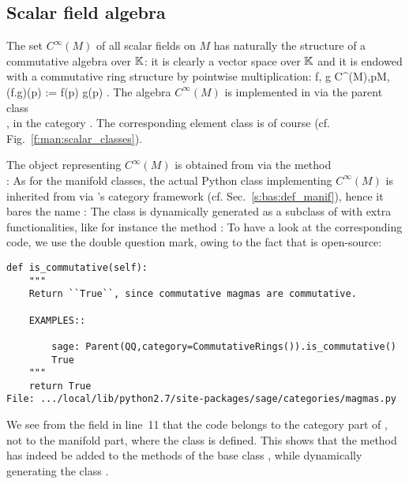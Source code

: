 \subsection{Scalar field algebra} \label{s:man:scal_algebra}

The set $C^\infty(M)$
of all scalar fields on $M$ has naturally the structure of a
commutative algebra over $\mathbb{K}$: it is clearly a vector
space over $\mathbb{K}$ and it is endowed with a commutative ring structure
by pointwise multiplication:
\be
\forall f, g \in C^\infty(M),\quad \forall p\in M,\quad
(f.g)(p) := f(p) g(p) .
\ee
The algebra $C^\infty(M)$ is implemented in \Sage{} via the parent
class\\ , in the category
. The corresponding element class
is of course  (cf. Fig.~\ref{f:man:scalar_classes}).

The \Sage{} object representing $C^\infty(M)$ is obtained from  via the
method\\ :
As for the manifold classes, the actual Python class implementing
$C^\infty(M)$ is inherited from  via \Sage{}'s
category framework (cf. Sec.~\ref{s:bas:def_manif}), hence it bares the name :
The class  is dynamically generated
as a subclass of  with extra functionalities, like
for instance the method :
To have a look at the corresponding code,
we use the double question mark, owing to the fact that \Sage{} is open-source:
\begin{lstlisting}
def is_commutative(self):
    """
    Return ``True``, since commutative magmas are commutative.

    EXAMPLES::

        sage: Parent(QQ,category=CommutativeRings()).is_commutative()
        True
    """
    return True
File: .../local/lib/python2.7/site-packages/sage/categories/magmas.py
\end{lstlisting}
We see from the  field in line~11 that the code belongs to the category part of \Sage{}, not to the
manifold part, where the class  is defined.
This shows that the method  has indeed be
added to the methods of the base class , while
dynamically generating the class  .


